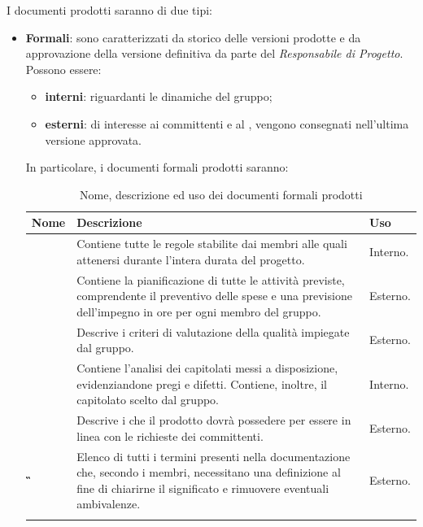 {{I documenti prodotti saranno di due tipi:
\begin{itemize}
	\item \textbf{Formali}: sono caratterizzati da storico delle versioni prodotte e da approvazione della versione definitiva da parte del \textit{Responsabile di Progetto}. Possono essere:
	\begin{itemize}
		\item \textbf{interni}: riguardanti le dinamiche del gruppo;
		\item \textbf{esterni}: di interesse ai committenti e al , vengono consegnati nell'ultima versione approvata.
	\end{itemize} 
In particolare, i documenti formali prodotti saranno:
{
	\setlength{\freewidth}{\dimexpr\textwidth-1\tabcolsep}
	\renewcommand{\arraystretch}{1.5}
	\setlength{\aboverulesep}{0pt}
	\setlength{\belowrulesep}{0pt}
	\begin{longtable}{L{.210\freewidth} L{.6\freewidth} L{.080\freewidth}}
		\textbf{Nome} & \textbf{Descrizione} & \textbf{Uso}\\
		\toprule
		\endhead		
		\textbf{\NdP{}} & Contiene tutte le regole stabilite dai membri alle quali attenersi durante l'intera durata del progetto. & Interno. \\ 
		\textbf{\PdP{}} & Contiene la pianificazione di tutte le attività previste, comprendente il preventivo delle spese e una previsione dell'impegno in ore per ogni membro del gruppo. & Esterno. \\
		\textbf{\PdQ{}} & Descrive i criteri di valutazione della qualità impiegate dal gruppo. & Esterno. \\ 
		\textbf{\SdF{}} & Contiene l'analisi dei capitolati messi a disposizione, evidenziandone pregi e difetti. Contiene, inoltre, il capitolato scelto dal gruppo. & Interno. \\
		\textbf{\AdR{}} & Descrive i  che il prodotto dovrà possedere per essere in linea con le richieste dei committenti. & Esterno. \\ 	
		\textbf{\G{}} & Elenco di tutti i termini presenti nella documentazione che, secondo i membri, necessitano una definizione al fine di chiarirne il significato e rimuovere eventuali ambivalenze. & Esterno. \\  			
		\bottomrule
		\hiderowcolors
		\caption{Nome, descrizione ed uso dei documenti formali prodotti}
	\end{longtable}
}


\end{itemize}}}
